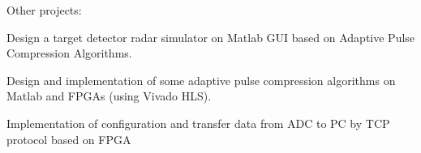 

\begin{cventries}

  \cventry
    {} %
    {Other projects:} %
    {} %
    {} %
    {
      \begin{cvitems} %
        \item {Design a target detector radar simulator on Matlab GUI based on Adaptive Pulse Compression Algorithms.}
        \item {Design and implementation of some adaptive pulse compression algorithms on Matlab and FPGAs (using Vivado HLS).}
	\item {Implementation of configuration and transfer data from ADC to PC by TCP protocol based on FPGA}
      \end{cvitems}
    }

\end{cventries}
